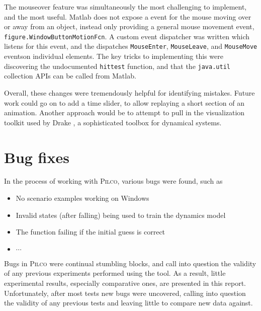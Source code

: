 \documentclass[main.tex]{subfiles}
\begin{document}
	The mouseover feature was simultaneously the most challenging to implement, and the most useful.
	Matlab does not expose a event for the mouse moving over or away from an object, instead only providing a general mouse movement event, \texttt{figure.WindowButtonMotionFcn}.
	A custom event dispatcher was written which listens for this event, and the dispatches \texttt{MouseEnter}, \texttt{MouseLeave}, and \texttt{MouseMove} events\footnotemark on individual elements.
	The key tricks to implementing this were discovering the undocumented \texttt{hittest} function\cite{matlab-hittest}, and that the \texttt{java.util} collection APIs can be called from Matlab.


	Overall, these changes were tremendously helpful for identifying mistakes.
	Future work could go on to add a time slider, to allow replaying a short section of an animation. Another approach would be to attempt to pull in the visualization toolkit used by Drake \cite{drake}, a sophisticated toolbox for dynamical systems.


\section{Bug fixes}

	In the process of working with \textsc{Pilco}, various bugs were found, such as
	\begin{itemize}
		\item No scenario examples working on Windows
		\item Invalid states (after falling) being used to train the dynamics model
		\item The  function failing if the initial guess is correct
		\item $\cdots$
	\end{itemize}
	Bugs in \textsc{Pilco} were continual stumbling blocks, and call into question the validity of any previous experiments performed using the tool.
	As a result, little experimental results, especially comparative ones, are presented in this report.
	Unfortunately, after most tests new bugs were uncovered, calling into question the validity of any previous tests and leaving little to compare new data against.


\bib
\end{document}
